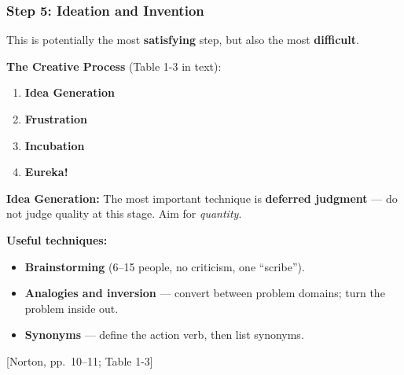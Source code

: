 \documentclass[10pt,aspectratio=43]{beamer}
\newcommand{\pref}[1]{\vfill\hfill{\scriptsize\color{gray}[Norton, pp.~#1]}}
\begin{document}
\begin{frame}
\frametitle{Step 5: Ideation and Invention}

This is potentially the most \textbf{satisfying} step, but also the most \textbf{difficult}.

\vspace{4pt}
\begin{yellowbox}
\textbf{The Creative Process} (Table 1-3 in text):
\begin{enumerate}
  \item[5a.] \textbf{Idea Generation}
  \item[5b.] \textbf{Frustration}
  \item[5c.] \textbf{Incubation}
  \item[5d.] \textbf{Eureka!}
\end{enumerate}
\end{yellowbox}

\vspace{4pt}
\textbf{Idea Generation:} The most important technique is \textbf{deferred judgment} --- do not judge quality at this stage. Aim for \emph{quantity}.

\vspace{4pt}
\textbf{Useful techniques:}
\begin{itemize}
  \item \textbf{Brainstorming} (6--15 people, no criticism, one ``scribe'').
  \item \textbf{Analogies and inversion} --- convert between problem domains; turn the problem inside out.
  \item \textbf{Synonyms} --- define the action verb, then list synonyms.
\end{itemize}
\pref{10--11; Table 1-3}
\end{frame}
\end{document}
